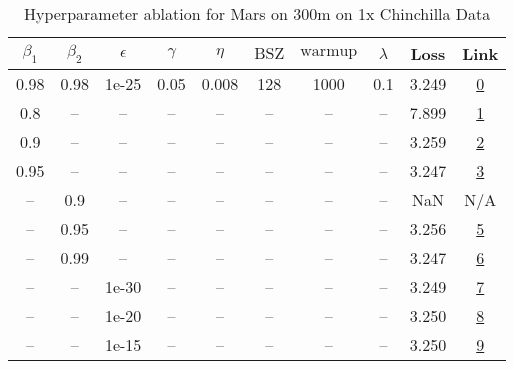\begin{table}[H]
\centering
\caption{Hyperparameter ablation for Mars on 300m on 1x Chinchilla Data}
\label{tab:ablation_mars_300m_1}
\begin{tabular}{cccccccccc}
\toprule
$\beta_1$ & $\beta_2$ & $\epsilon$ & $\gamma$ & $\eta$ & $\mathrm{BSZ}$ & $\mathrm{warmup}$ & $\lambda$ & Loss & Link \\
\midrule
0.98 & 0.98 & 1e-25 & 0.05 & 0.008 & 128 & 1000 & 0.1 & 3.249 & \href{https://wandb.ai/stanford-mercury/optimizer-scaling/runs/sweep-300m-6B-mars9c7f7elr0.008-wd0.1-minlr0-warmup1000-b10.98-b-f63232}{0} \\
\midrule
0.8 & -- & -- & -- & -- & -- & -- & -- & 7.899 & \href{https://wandb.ai/stanford-mercury/optimizer-scaling/runs/sweep-300m-6B-mars51e60dlr0.008-wd0.1-minlr0-warmup1000-b10.8-b2-fcc8df}{1} \\
0.9 & -- & -- & -- & -- & -- & -- & -- & 3.259 & \href{https://wandb.ai/stanford-mercury/optimizer-scaling/runs/sweep-300m-6B-mars9bd75elr0.008-wd0.1-minlr0-warmup1000-b10.9-b2-cab9f0}{2} \\
0.95 & -- & -- & -- & -- & -- & -- & -- & 3.247 & \href{https://wandb.ai/stanford-mercury/optimizer-scaling/runs/sweep-300m-6B-mars328fcflr0.008-wd0.1-minlr0-warmup1000-b10.95-b-ce45f8}{3} \\
-- & 0.9 & -- & -- & -- & -- & -- & -- & NaN & N/A \\
-- & 0.95 & -- & -- & -- & -- & -- & -- & 3.256 & \href{https://wandb.ai/stanford-mercury/optimizer-scaling/runs/sweep-300m-6B-mars9f27e3lr0.008-wd0.1-minlr0-warmup1000-b10.98-b-a25628}{5} \\
-- & 0.99 & -- & -- & -- & -- & -- & -- & 3.247 & \href{https://wandb.ai/stanford-mercury/optimizer-scaling/runs/sweep-300m-6B-mars4f9747lr0.008-wd0.1-minlr0-warmup1000-b10.98-b-fd94ca}{6} \\
-- & -- & 1e-30 & -- & -- & -- & -- & -- & 3.249 & \href{https://wandb.ai/stanford-mercury/optimizer-scaling/runs/sweep-300m-6B-mars9c7f7elr0.008-wd0.1-minlr0-warmup1000-b10.98-b-f63232}{7} \\
-- & -- & 1e-20 & -- & -- & -- & -- & -- & 3.250 & \href{https://wandb.ai/stanford-mercury/optimizer-scaling/runs/sweep-300m-6B-mars25812alr0.008-wd0.1-minlr0-warmup1000-b10.98-b-0e08ff}{8} \\
-- & -- & 1e-15 & -- & -- & -- & -- & -- & 3.250 & \href{https://wandb.ai/stanford-mercury/optimizer-scaling/runs/sweep-300m-6B-mars1653ealr0.008-wd0.1-minlr0-warmup1000-b10.98-b-691b72}{9} \\

\end{tabular}
\end{table}
